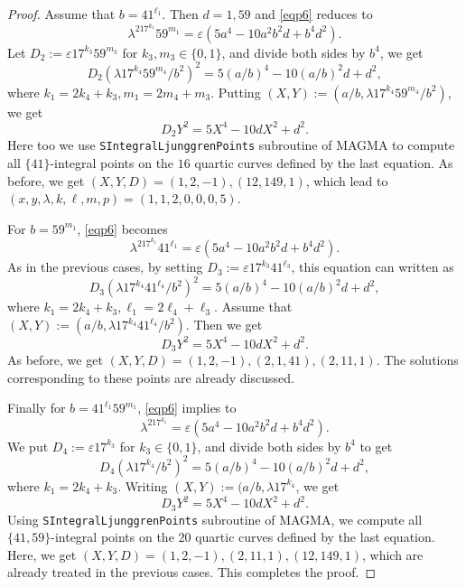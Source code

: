 \documentclass[10pt,a4paper]{amsart}
\begin{document}
\begin{proof}
Assume that $b=41^{\ell_1}$.  Then $d=1, 59$ and \eqref{eqp6} reduces to
$$\lambda^217^{k_1}59^{m_1}=\varepsilon (5a^4-10a^2b^2d+b^4d^2).$$
Let $D_2:=\varepsilon 17^{k_3}59^{m_3}$ for $k_3, m_3\in\{0, 1\}$, and divide both sides by $b^4$, we get
$$D_2(\lambda 17^{k_4}59^{m_4}/b^2)^2=5(a/b)^4-10(a/b)^2d+d^2,$$
where $ k_1=2k_4+k_3, m_1=2m_4+m_3$.
Putting $(X, Y):=(a/b, \lambda 17^{k_4}59^{m_4}/b^2)$, we get
$$D_2Y^2=5X^4-10dX^2+d^2.$$
Here too we use \texttt{SIntegralLjunggrenPoints} subroutine of MAGMA to compute all $\{41\}$-integral points on the $16$ quartic curves defined by the last equation. As before, we get $(X,Y, D)=(1,2,-1), (12,149,1)$, which lead to  $(x,y,\lambda,k,\ell,m,p)=(1,1,2,0,0,0,5)$.

For $b=59^{m_1}$,  \eqref{eqp6} becomes 
$$\lambda^217^{k_1}41^{\ell_1}=\varepsilon (5a^4-10a^2b^2d+b^4d^2).$$
As in the previous cases, by setting $D_3:=\varepsilon 17^{k_3}41^{\ell_3}$, this equation can written as
$$D_3(\lambda 17^{k_4}41^{\ell_4}/b^2)^2=5(a/b)^4-10(a/b)^2d+d^2,$$
where $ k_1=2k_4+k_3, \ell_1=2\ell_4+\ell_3$.
Assume that $(X, Y):=(a/b, \lambda 17^{k_4}41^{\ell_4}/b^2)$. Then we get
$$D_3Y^2=5X^4-10dX^2+d^2.$$
As before, we get $(X,Y, D)=(1,2,-1), (2,1,41), (2,11,1)$. The solutions corresponding to these points are already discussed.

Finally for $b=41^{\ell_1}59^{m_1}$, \eqref{eqp6} implies to
$$\lambda^217^{k_1}=\varepsilon (5a^4-10a^2b^2d+b^4d^2).$$
We put $D_4:=\varepsilon 17^{k_3}$ for $k_3\in\{0, 1\}$, and divide both sides by $b^4$ to get
$$D_4(\lambda 17^{k_4}/b^2)^2=5(a/b)^4-10(a/b)^2d+d^2,$$
where $ k_1=2k_4+k_3$.
Writing $(X, Y):=(a/b, \lambda 17^{k_4}$, we get
$$D_3Y^2=5X^4-10dX^2+d^2.$$
Using \texttt{SIntegralLjunggrenPoints} subroutine of MAGMA, we compute all $\{41,59\}$-integral points on the $20$ quartic curves defined by the last equation. Here, we get $(X,Y, D)=(1,2,-1), (2,11,1), (12, 149,1)$, which are already treated in the previous cases. This completes the proof.
\end{proof}
\end{document}
